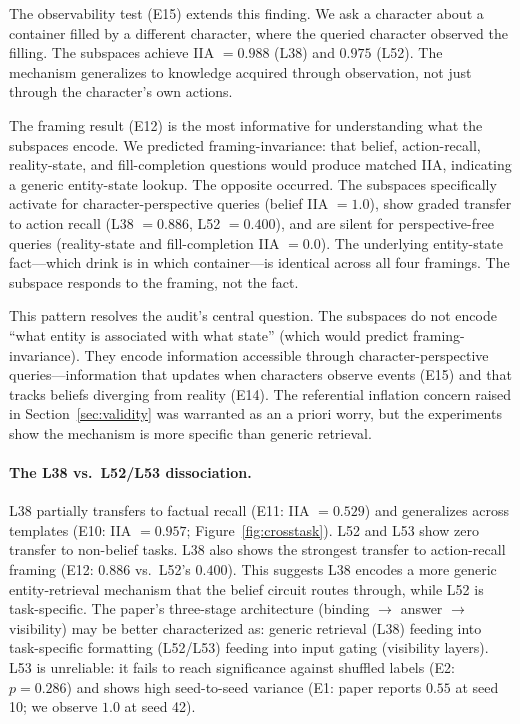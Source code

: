 \documentclass[11pt]{article}
\begin{document}
The observability test (E15) extends this finding. We ask a character about a container filled by a different character, where the queried character observed the filling. The subspaces achieve IIA $= 0.988$ (L38) and $0.975$ (L52). The mechanism generalizes to knowledge acquired through observation, not just through the character's own actions.

The framing result (E12) is the most informative for understanding what the subspaces encode. We predicted framing-invariance: that belief, action-recall, reality-state, and fill-completion questions would produce matched IIA, indicating a generic entity-state lookup. The opposite occurred. The subspaces specifically activate for character-perspective queries (belief IIA $= 1.0$), show graded transfer to action recall (L38 $= 0.886$, L52 $= 0.400$), and are silent for perspective-free queries (reality-state and fill-completion IIA $= 0.0$). The underlying entity-state fact---which drink is in which container---is identical across all four framings. The subspace responds to the framing, not the fact.

This pattern resolves the audit's central question. The subspaces do not encode ``what entity is associated with what state'' (which would predict framing-invariance). They encode information accessible through character-perspective queries---information that updates when characters observe events (E15) and that tracks beliefs diverging from reality (E14). The referential inflation concern raised in Section~\ref{sec:validity} was warranted as an a priori worry, but the experiments show the mechanism is more specific than generic retrieval.

\paragraph{The L38 vs.\ L52/L53 dissociation.}
L38 partially transfers to factual recall (E11: IIA $= 0.529$) and generalizes across templates (E10: IIA $= 0.957$; Figure~\ref{fig:crosstask}). L52 and L53 show zero transfer to non-belief tasks. L38 also shows the strongest transfer to action-recall framing (E12: $0.886$ vs.\ L52's $0.400$). This suggests L38 encodes a more generic entity-retrieval mechanism that the belief circuit routes through, while L52 is task-specific. The paper's three-stage architecture (binding $\to$ answer $\to$ visibility) may be better characterized as: generic retrieval (L38) feeding into task-specific formatting (L52/L53) feeding into input gating (visibility layers). L53 is unreliable: it fails to reach significance against shuffled labels (E2: $p = 0.286$) and shows high seed-to-seed variance (E1: paper reports $0.55$ at seed 10; we observe $1.0$ at seed 42).
\end{document}
